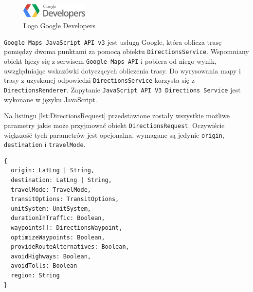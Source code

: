 \documentclass[eng,printmode,oneside]{mgr}
\begin{document}
\begin{figure}
\centering
\vspace{-15pt}
\includegraphics[width=0.3\textwidth]{googlelogo.png}
\caption{Logo Google Developers \cite{developer.google}}
\label{fig:googlelogo}
\vspace{-10pt}
\end{figure}

\texttt{Google Maps JavaScript API v3} jest usługą Google, która oblicza trasę
pomiędzy dwoma punktami za pomocą obiektu \texttt{DirectionsService}.
Wspomniany obiekt łączy się z serwisem \texttt{Google Maps API} i pobiera od niego wynik, uwzględniając wskazówki
dotyczących obliczenia trasy. Do wyrysowania mapy i
trasy z uzyskanej odpowiedzi \texttt{DirectionsService} korzysta się z
\texttt{DirectionsRenderer}. Zapytanie \texttt{JavaScript API V3 Directions
Service} jest wykonane w języku JavaScript.

Na listingu \ref{lst:DirectionsRequest} przedstawione zostały wszystkie możliwe
parametry jakie może przyjmować obiekt \texttt{DirectionsRequest}. Oczywiście
większość tych parametrów jest opcjonalna, wymagane są jedynie \texttt{origin},
\texttt{destination} i \texttt{travelMode}.

\begin{lstlisting}[caption=Parametry jakie może
przyjmować obiekt typu \texttt{DirectionsRequest},label=lst:DirectionsRequest] 
{
  origin: LatLng | String,
  destination: LatLng | String,
  travelMode: TravelMode,
  transitOptions: TransitOptions,
  unitSystem: UnitSystem,
  durationInTraffic: Boolean,
  waypoints[]: DirectionsWaypoint,
  optimizeWaypoints: Boolean,
  provideRouteAlternatives: Boolean,
  avoidHighways: Boolean,
  avoidTolls: Boolean
  region: String
}
\end{lstlisting}
\end{document}
